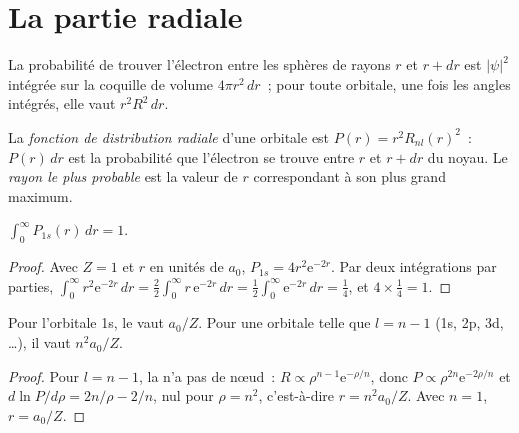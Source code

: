 \section{La partie radiale}

La probabilité de trouver l'électron entre les sphères de rayons $r$ et $r +
dr$ est $|\psi|^2$ intégrée sur la coquille de volume $4\pi r^2\,dr$~; pour toute
orbitale, une fois les angles intégrés, elle vaut $r^2R^2\,dr$.

\begin{definition}\label{def:b2:atomic-orbitals:radial-distribution}
La \emph{fonction de distribution radiale} d'une
orbitale est $P(r) = r^2R_{nl}(r)^2$~: $P(r)\,dr$ est la probabilité que
l'électron se trouve entre $r$ et $r + dr$ du noyau. Le \emph{rayon le plus
probable} est la valeur de $r$ correspondant à son plus grand maximum.
\end{definition}

\begin{proposition}[Normalisation de 1s]\label{prop:b2:atomic-orbitals:normalised}
$\int_0^\infty P_{1s}(r)\,dr = 1$.
\end{proposition}

\begin{proof}
Avec $Z = 1$ et $r$ en unités de $a_0$, $P_{1s} = 4r^2\mathrm e^{-2r}$. Par deux intégrations par parties,
$\int_0^\infty r^2\mathrm e^{-2r}\,dr = \frac22\int_0^\infty r\,\mathrm e^{-2r}\,dr =
\frac12\int_0^\infty\mathrm e^{-2r}\,dr = \frac14$, et $4 \times \frac14 = 1$.
\end{proof}

\begin{proposition}\label{prop:b2:atomic-orbitals:most-probable}
Pour l'orbitale 1s, le  vaut $a_0/Z$. Pour une orbitale telle que $l =
n - 1$ (1s, 2p, 3d, \dots), il vaut $n^2a_0/Z$.
\end{proposition}

\begin{proof}
Pour $l = n - 1$, la  n'a pas de nœud~: $R \propto \rho^{n-1}\mathrm e^{-\rho/n}$,
donc $P \propto \rho^{2n}\mathrm e^{-2\rho/n}$ et $d\ln P/d\rho = 2n/\rho - 2/n$, nul
pour $\rho = n^2$, c'est-à-dire $r = n^2a_0/Z$. Avec $n = 1$, $r = a_0/Z$.
\end{proof}

